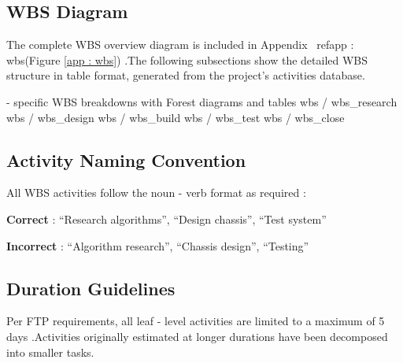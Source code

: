     \subsection{WBS Diagram}

    The complete WBS overview diagram is included in Appendix \
    ref{app : wbs}(Figure \ref{app : wbs})
        .The following
        subsections show the detailed WBS structure in table format,
        generated from the project's activities database.



            - specific WBS breakdowns with Forest diagrams and tables
 {
      wbs / wbs_research
    }
     { wbs / wbs_design }
     { wbs / wbs_build }
     { wbs / wbs_test }
     { wbs / wbs_close }

    \subsection{Activity Naming Convention}

        All WBS activities follow the noun -
        verb format as required :

\begin {
      itemize
    }
    \item \textbf{Correct} : ``Research algorithms'', ``Design chassis'', ``Test system''
    \item \textbf{Incorrect} : ``Algorithm research'', ``Chassis design'', ``Testing''
\end {
      itemize
    }

    \subsection{Duration Guidelines}

    Per FTP requirements,
        all leaf - level activities are limited to a maximum of 5 days
                       .Activities originally estimated at longer durations have
                           been decomposed into smaller tasks.
